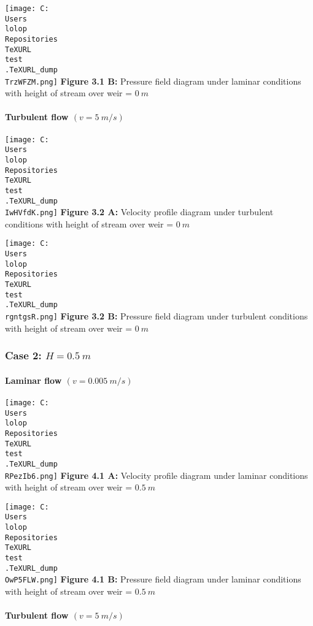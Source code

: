 \documentclass[11pt]{article}
\begin{document}
\texttt{[image: C:\\Users\\lolop\\Repositories\\TeXURL\\test\\.TeXURL\_dump\\TrzWFZM.png]} \textbf{Figure 3.1 B:}
Pressure field diagram under laminar conditions with height of stream
over weir = \(0\ m\)

\hypertarget{turbulent-flow-v-5-ms}{%
\paragraph{\texorpdfstring{Turbulent flow
\((v = 5\ m/s)\)}{Turbulent flow (v = 5\textbackslash{} m/s)}}\label{turbulent-flow-v-5-ms}}

\texttt{[image: C:\\Users\\lolop\\Repositories\\TeXURL\\test\\.TeXURL\_dump\\IwHVfdK.png]} \textbf{Figure 3.2 A:}
Velocity profile diagram under turbulent conditions with height of
stream over weir = \(0\ m\)

\texttt{[image: C:\\Users\\lolop\\Repositories\\TeXURL\\test\\.TeXURL\_dump\\rgntgsR.png]} \textbf{Figure 3.2 B:}
Pressure field diagram under turbulent conditions with height of stream
over weir = \(0\ m\)

\hypertarget{case-2-h-0.5-m-1}{%
\subsubsection{\texorpdfstring{Case 2:
\(H = 0.5\ m\)}{Case 2: H = 0.5\textbackslash{} m}}\label{case-2-h-0.5-m-1}}

\hypertarget{laminar-flow-v-0.005-ms-1}{%
\paragraph{\texorpdfstring{Laminar flow
\((v = 0.005\ m/s)\)}{Laminar flow (v = 0.005\textbackslash{} m/s)}}\label{laminar-flow-v-0.005-ms-1}}

\texttt{[image: C:\\Users\\lolop\\Repositories\\TeXURL\\test\\.TeXURL\_dump\\RPezIb6.png]} \textbf{Figure 4.1 A:}
Velocity profile diagram under laminar conditions with height of stream
over weir = \(0.5\ m\)

\texttt{[image: C:\\Users\\lolop\\Repositories\\TeXURL\\test\\.TeXURL\_dump\\OwP5FLW.png]} \textbf{Figure 4.1 B:}
Pressure field diagram under laminar conditions with height of stream
over weir = \(0.5\ m\)

\hypertarget{turbulent-flow-v-5-ms-1}{%
\paragraph{\texorpdfstring{Turbulent flow
\((v = 5\ m/s)\)}{Turbulent flow (v = 5\textbackslash{} m/s)}}\label{turbulent-flow-v-5-ms-1}}
\end{document}
